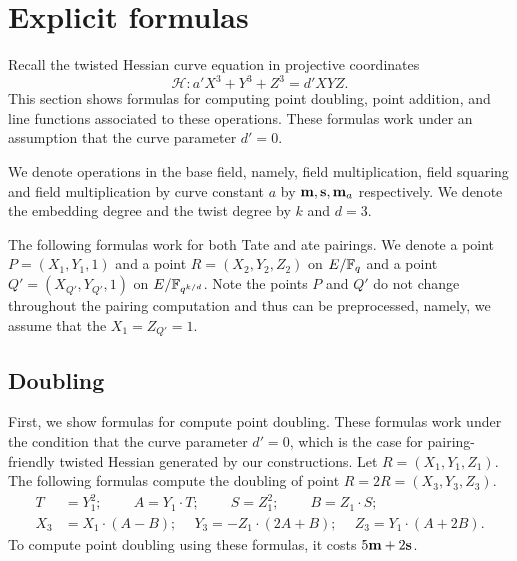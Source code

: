 \section{Explicit formulas}
\label{sec:formulas}

Recall the twisted Hessian curve equation in projective coordinates
$$ \mathcal{H}: a' X^3 + Y^3 + Z^3 = d' X Y Z. $$
This section shows formulas for computing point doubling, point addition,
and line functions associated to these operations.
These formulas work under an assumption that the curve parameter $d' = 0$.

We denote operations in the base field, namely, 
field multiplication, field squaring and field multiplication by curve constant $a$
by $\textbf{m}, \textbf{s}, \textbf{m}_{a}$ respectively.
We denote the embedding degree and the twist degree by $k$ and $d=3$.

The following formulas work for both Tate and ate pairings.
We denote a point $P = (X_1,Y_1,1)$ and a point $R = (X_2,Y_2,Z_2)$ on $E/\mathbb{F}_{q}$
and a point $Q' = (X_{Q'},Y_{Q'},1)$ on $E/\mathbb{F}_{q^{k/d}}$.
Note the points $P$ and $Q'$ do not change throughout the pairing computation and thus can be preprocessed,
namely, we assume that the $X_1 = Z_{Q'} = 1$.



\subsection{Doubling}
First, we show formulas for compute point doubling.
These formulas work under the condition that the curve parameter $d'=0$,
which is the case for pairing-friendly twisted Hessian generated by our constructions.
Let $R = (X_1, Y_1, Z_1)$.
The following formulas compute the doubling of point $R = 2R = (X_3,Y_3,Z_3)$.
\begin{align*}
T &= Y_1^2;\	\qquad	A = Y_1 \cdot T;\	\qquad
S = Z_1 ^ 2;\	\qquad	B = Z_1 \cdot S;\\
X_3 &= X_1 \cdot (A - B);\	\quad
Y_3 = -Z_1 \cdot (2A + B);\	\quad
Z_3 = Y_1 \cdot (A + 2B).
\end{align*}
To compute point doubling using these formulas,
it costs $5\textbf{m} + 2\textbf{s}$. %

